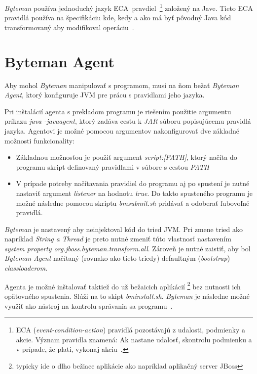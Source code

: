 \documentclass[11pt,final,oneside]{fithesis}
\begin{document}
\textit{Byteman} používa jednoduchý jazyk
ECA~pravdiel~\footnote{ECA (\textit{event-condition-action}) pravidlá 
pozostávajú z udalosti, podmienky a akcie. Význam pravidla znamená: Ak nastane 
udalosť, skontrolu podmienku a v prípade, že platí, vykonaj
akciu~\cite{Sellis:ECARules}.} založený na Jave. Tieto ECA pravidlá
používa na špecifikáciu kde, kedy a ako má byť pôvodný Java kód transformovaný
aby modifikoval operáciu~\cite{RedHat:Byteman}.

\section{Byteman Agent}

Aby mohol \textit{Byteman} manipulovať s programom, musí na ňom bežať
\textit{Byteman Agent}, ktorý konfiguruje JVM pre prácu s pravidlami
jeho jazyka.

Pri inštalácií agenta s prekladom programu je riešením použitie argumentu
príkazu \textit{java -javaagent}, ktorý zadáva cestu k \textit{JAR} súboru
popisujúcemu pravidlá jazyka. Agentovi je možné pomocou argumentov
nakonfigurovať dve základné možnosti funkcionality:

\begin{itemize}
\item Základnou možnosťou je použiť argument \textit{script:[PATH]}, ktorý
načíta do programu skript definovaný pravidlami v súbore s cestou
\textit{PATH}
\item V prípade potreby načítavania pravidiel do programu aj po spustení je nutné
nastaviť argument \textit{listener} na hodnotu \textit{true}. Do takto
spusteného programu je možné následne pomocou skriptu \textit{bmsubmit.sh}
pridávať a odoberať ľubovoľné pravidlá.
\end{itemize}

\textit{Byteman} je nastavený aby neinjektoval kód do tried JVM. Pri zmene tried
ako napríklad \textit{String a Thread} je preto nutné zmeniť túto vlastnosť
nastavením \textit{system property org.jboss.byteman.transform.all}. Zároveň je 
nutné zaistiť, aby bol \textit{Byteman Agent} načítaný (rovnako ako tieto triedy)
defaultným (\textit{bootstrap}) \textit{classloaderom}.

Agenta je možné inštalovať taktiež do už bežaicich aplikácií \footnote{typicky
ide o dlho bežiace aplikácie ako napríklad aplikačný server JBoss} bez nutnosti 
ich opätovného spustenia. Slúži na to skipt \textit{bminstall.sh}.
\textit{Byteman} je následne možné využiť ako nástroj na kontrolu správania sa 
programu~\cite{RedHat:Byteman}. 
\end{document}
